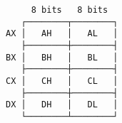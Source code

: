 \documentclass[varwidth,crop]{standalone}
\begin{document}
\begin{verbatim}
     8 bits   8 bits
   ┌────────┬────────┐
AX │   AH   │   AL   │
   ├────────┼────────┤
BX │   BH   │   BL   │
   ├────────┼────────┤
CX │   CH   │   CL   │
   ├────────┼────────┤
DX │   DH   │   DL   │
   └────────┴────────┘
\end{verbatim}
\end{document}
